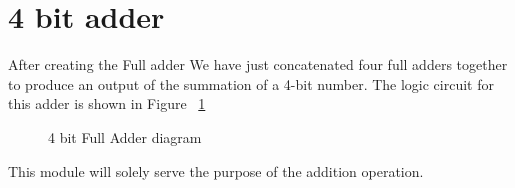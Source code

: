 \documentclass[a4paper, 12pt, twoside]{scrreprt}
\begin{document}
\section{4 bit adder}
After creating the Full adder We have just concatenated four full adders together to produce an output of the summation of a 4-bit number. The logic circuit for this adder is shown in Figure ~\ref{Fa4}
\begin{center}
\begin{figure}[h]
\begin{center}
\end{center} 
\caption{4 bit Full Adder diagram \label{Fa4}}
\end{figure}
\end{center}
This module will solely serve the purpose of the addition operation.
\end{document}
